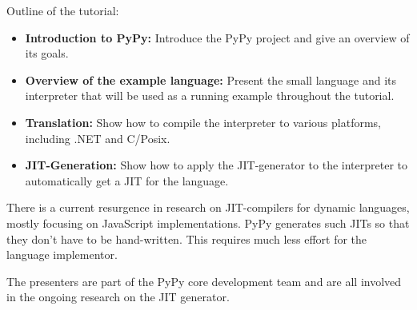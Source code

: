 \documentclass{llncs}
\begin{document}
Outline of the tutorial:
\begin{itemize}
 \item \textbf{Introduction to PyPy:} Introduce the PyPy project and give an
 overview of its goals.
 \item \textbf{Overview of the example language:} Present the small language and
 its interpreter that will be used as a running example throughout the tutorial.
 \item \textbf{Translation:} Show how to compile the interpreter to various
 platforms, including .NET and C/Posix.
 \item \textbf{JIT-Generation:} Show how to apply the JIT-generator to the
 interpreter to automatically get a JIT for the language.
\end{itemize}


There is a current resurgence in research on JIT-compilers for dynamic
languages, mostly focusing on JavaScript implementations. PyPy generates such
JITs so that they don't have to be hand-written. This requires much less effort
for the language implementor.

The presenters are part of the PyPy core development team and are all involved
in the ongoing research on the JIT generator. 



\end{document}
